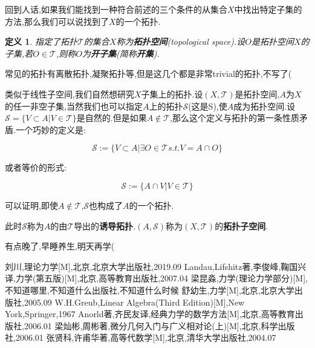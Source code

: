 \documentclass[UTF8]{article}
\begin{document}
	回到人话,如果我们能找到一种符合前述的三个条件的从集合$X$中找出特定子集的方法,那么我们可以说找到了$X$的一个拓扑.
	
	\newtheorem*{topologicalSpace}{定义}
	
	\begin{topologicalSpace}
		
		指定了拓扑$\mathscr{T}$的集合$X$称为\textbf{拓扑空间}(topological space).设$O$是拓扑空间$X$的子集,若$O \in \mathscr{T}$,则称$O$为\textbf{开子集}(简称\textbf{开集}).
		
	\end{topologicalSpace}
	
	常见的拓扑有离散拓扑,凝聚拓扑等,但是这几个都是非常trivial的拓扑,不写了(
	
	类似于线性子空间,我们自然想研究$X$子集上的拓扑.设$(X,\mathscr{T})$是拓扑空间,$A$为$X$的任一非空子集,当然我们也可以指定$A$上的拓扑$\mathscr{S}$(这是S),使$A$成为拓扑空间.设$\mathscr{S} = \{V \subset A | V \in \mathscr{T}\}$是自然的.但是如果$A \notin \mathscr{T}$,那么这个定义与拓扑的第一条性质矛盾.一个巧妙的定义是:
	
	\[\mathscr{S} := \{V \subset A | \exists O \in \mathscr{T} s.t. V = A \cap O\}\]
	
	或者等价的形式:
	
	\[\mathscr{S} := \{A \cap V | V \in \mathscr{T}\}\]
	
	可以证明,即使$A\notin\mathscr{T}$,$\mathscr{S}$也构成了$A$的一个拓扑.
	
	此时$\mathscr{S}$称为$A$的由$\mathscr{T}$导出的\textbf{诱导拓扑}.$(A,\mathscr{S})$称为$(X,\mathscr{T})$的\textbf{拓扑子空间}.
	
	有点晚了,早睡养生,明天再学(
	
	
	
	
	\newpage	
	
	\begin{thebibliography}{?}
		 刘川,理论力学[M],北京,北京大学出版社,2019.09
		 Landau,Lifshitz著,李俊峰,鞠国兴译,力学(第五版)[M],北京,高等教育出版社,2007.04
		 梁昆淼,力学(理论力学部分)[M],不知道哪里,不知道什么出版社,不知道什么时候
		 舒幼生,力学[M],北京,北京大学出版社,2005.09
		 W.H.Greub,Linear Algebra(Third Edition)[M],New York,Springer,1967
		 Anorld著,齐民友译,经典力学的数学方法[M],北京,高等教育出版社,2006.01
		 梁灿彬,周彬著,微分几何入门与广义相对论(上)[M],北京,科学出版社,2006.01
		 张贤科,许甫华著,高等代数学[M],北京,清华大学出版社,2004.07
	\end{thebibliography}
	
	
	
	
	
	
\end{document}
